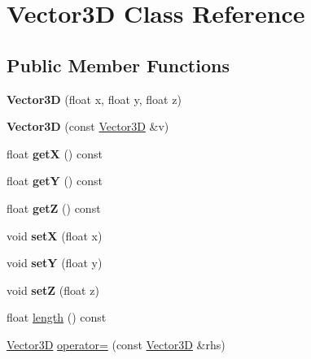 \hypertarget{classVector3D}{}\section{Vector3D Class Reference}
\label{classVector3D}
\subsection*{Public Member Functions}
\begin{DoxyCompactItemize}
\item 
\mbox{\label{classVector3D_a17ed921510dc931d9686b7d9333f6d57}} 
{\bfseries Vector3D} (float x, float y, float z)
\item 
\mbox{\label{classVector3D_a765ee7fc4bf9c338cb96fbd0499257a1}} 
{\bfseries Vector3D} (const \hyperlink{classVector3D}{Vector3D} \&v)
\item 
\mbox{\label{classVector3D_a1c2679622aef3b49ed30857ca3eda472}} 
float {\bfseries getX} () const
\item 
\mbox{\label{classVector3D_a1568588ea6695cb2a5680b156f45f961}} 
float {\bfseries getY} () const
\item 
\mbox{\label{classVector3D_ab5f2c9a3a82269a8797d2fea70602ede}} 
float {\bfseries getZ} () const
\item 
\mbox{\label{classVector3D_ac3904b095a2440b9067effc640cf7e5e}} 
void {\bfseries setX} (float x)
\item 
\mbox{\label{classVector3D_a4672b17cd2a364928149b689958e273d}} 
void {\bfseries setY} (float y)
\item 
\mbox{\label{classVector3D_a2433f43f72a29a8b330ca6ef346eb6ab}} 
void {\bfseries setZ} (float z)
\item 
float \hyperlink{classVector3D_abccd775509e00038dac9e3a48e74083a}{length} () const
\item 
\hyperlink{classVector3D}{Vector3D} \hyperlink{classVector3D_ae19e70a6888b99ec7fb3e48c04cf6386}{operator=} (const \hyperlink{classVector3D}{Vector3D} \&rhs)
\item 

\end{DoxyCompactItemize}
